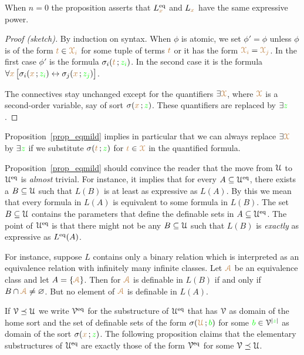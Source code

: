 \documentclass[creche.tex]{subfiles}
\begin{document}
When $n=0$ the proposition asserts that $L_{{\color{brown} x}}^{{\rm eq}}$ and $L_{{\color{brown} x}}$ have the same expressive power.

\begin{proof}[Proof (sketch)]
By induction on syntax.
When $\phi$ is atomic, we set $\phi'=\phi$ unless $\phi$ is of the form ${\color{brown} t}\in {\color{brown}\EuScript X_i}$ for some tuple of terms ${\color{brown} t}$ or it has the form ${\color{brown}\EuScript X_i}={\color{brown}\EuScript X_j}$.
In the first case $\phi'$ is the formula $\sigma_i({\color{brown} t}\,;{\color{green} z_i})$.
In the second case it is the formula $\forall {\color{brown}x}\,\big[\sigma_i({\color{brown} x}\,;{\color{green} z_i}) \leftrightarrow\sigma_j({\color{brown} x}\,;{\color{green} z_j})\big]$. 

The connectives stay unchanged except for the quantifiers $\exists {\color{brown}\EuScript X}$, where ${\color{brown}\EuScript X}$ is a second-order variable, say of sort $\sigma({\color{brown} x}\,;{\color{green} z})$.
These quantifiers are replaced by $\exists{\color{green}z}$.
\end{proof}

Proposition~\ref{prop_eqmild} implies in particular that we can always replace $\exists {\color{brown}\EuScript X}$ by $\exists {\color{green}z}$ if we substitute $\sigma({\color{brown} t}\,;{\color{green} z})$ for ${\color{brown} t}\in {\color{brown}\EuScript X}$ in the quantified formula.



\begin{remark}\label{rem_eqmild}
Proposition~\ref{prop_eqmild} should convince the reader that the move from $\EuScript U$ to $\EuScript U^{{\rm eq}}$ is \textit{almost\/} trivial.
For instance, it implies that for every $A\subseteq\EuScript U^{{\rm eq}}$, there exists a $B\subseteq\EuScript U$ such that $L(B)$ is at least as expressive as $L(A)$.
By this we mean that every formula in $L(A)$ is equivalent to some formula in $L(B)$.
The set $B\subseteq\EuScript U$ contains the parameters that define the definable sets in $A\subseteq\EuScript U^{{\rm eq}}$.
The point of $\EuScript U^{{\rm eq}}$ is that there might not be any $B\subseteq\EuScript U$ such that $L(B)$ is \textit{exactly\/} as expressive as $L^{{\rm eq}}(A)$.

For instance, suppose $L$ contains only a binary relation which is interpreted as an equivalence relation with infinitely many infinite classes.
Let ${\color{brown}\EuScript A}$ be an equivalence class and let $A=\{{\color{brown}\EuScript A}\}$.
Then for ${\color{brown}\EuScript A}$ is definable in $L(B)$ if and only if $B\cap {\color{brown}\EuScript A}\neq\varnothing$.
But no element of ${\color{brown}\EuScript A}$ is definable in $L(A)$.\QED
\end{remark}

If $\EuScript V\preceq\EuScript U$ we write \emph{$\EuScript V^{{{\rm eq}}}$\/} for the substructure of $\EuScript U^{{\rm eq}}$ that has $\EuScript V$ as domain of the home sort and  the set of definable sets of the form $\sigma({\color{brown}\EuScript U}\,;{\color{green} b})$ for some ${\color{green} b}\in \EuScript V^{|{\color{green} z}|}$ as domain of the sort $\sigma({\color{brown} x}\,;{\color{green} z})$.
The following proposition claims that the elementary substructures of $\EuScript U^{{\rm eq}}$ are exactly those of the form $\EuScript V^{{\rm eq}}$ for some $\EuScript V\preceq\EuScript U$.
\end{document}
